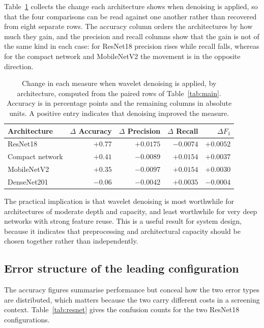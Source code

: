 \documentclass[pdflatex,sn-mathphys-num]{sn-jnl}
\begin{document}
Table~\ref{tab:delta} collects the change each architecture shows when
denoising is applied, so that the four comparisons can be read against one
another rather than recovered from eight separate rows. The accuracy column
orders the architectures by how much they gain, and the precision and recall
columns show that the gain is not of the same kind in each case: for ResNet18
precision rises while recall falls, whereas for the compact network and
MobileNetV2 the movement is in the opposite direction.

\begin{table}[t]
\centering
\footnotesize
\caption{Change in each measure when wavelet denoising is applied, by
architecture, computed from the paired rows of Table~\ref{tab:main}. Accuracy
is in percentage points and the remaining columns in absolute units. A
positive entry indicates that denoising improved the measure.}
\label{tab:delta}
\begin{tabular}{@{}lrrrr@{}}
\toprule
Architecture & $\Delta$ Accuracy & $\Delta$ Precision & $\Delta$ Recall & $\Delta F_1$ \\
\midrule
ResNet18 & $+0.77$ & $+0.0175$ & $-0.0074$ & $+0.0052$ \\
Compact network & $+0.41$ & $-0.0089$ & $+0.0154$ & $+0.0037$ \\
MobileNetV2 & $+0.35$ & $-0.0097$ & $+0.0154$ & $+0.0030$ \\
DenseNet201 & $-0.06$ & $-0.0042$ & $+0.0035$ & $-0.0004$ \\
\bottomrule
\end{tabular}
\end{table}

The practical implication is that wavelet denoising is most worthwhile for
architectures of moderate depth and capacity, and least worthwhile for very
deep networks with strong feature reuse. This is a useful result for system
design, because it indicates that preprocessing and architectural capacity
should be chosen together rather than independently.

\subsection{Error structure of the leading configuration}\label{sec:res-errors}

The accuracy figures summarise performance but conceal how the two error types
are distributed, which matters because the two carry different costs in a
screening context. Table~\ref{tab:resnet} gives the confusion counts for the
two ResNet18 configurations.
\end{document}
